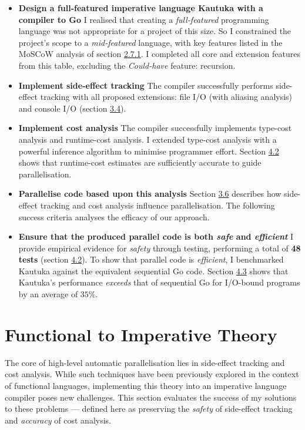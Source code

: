 \begin{itemize}[itemindent=-1cm]
  \item[] \textbf{Design a full-featured imperative language Kautuka with a compiler to Go} I realised that creating a \textit{full-featured} programming language was not appropriate for a project of this size. So I constrained the project's scope to a \textit{mid-featured} language, with key features listed in the MoSCoW analysis of section \hyperref[sec:2.7.1]{2.7.1}. I completed all core and extension features from this table, excluding the \textit{Could-have} feature: recursion.
  \item[] \textbf{Implement side-effect tracking} The compiler successfully performs side-effect tracking with all proposed extensions: file I/O (with aliasing analysis) and console I/O (section \hyperref[sec:3.4]{3.4}).
  \item[] \textbf{Implement cost analysis} The compiler successfully implements type-cost analysis and runtime-cost analysis. I extended type-cost analysis with a powerful inference algorithm to minimise programmer effort. Section \hyperref[sec:4.2]{4.2} shows that runtime-cost estimates are sufficiently accurate to guide parallelisation.
  \item[] \textbf{Parallelise code based upon this analysis} Section \hyperref[sec:3.6]{3.6} describes how side-effect tracking and cost analysis influence parallelisation. The following success criteria analyses the efficacy of our approach.
  \item[] \textbf{Ensure that the produced parallel code is both \textit{safe} and \textit{efficient}} I provide empirical evidence for \textit{safety} through testing, performing a total of \textbf{48 tests} (section \hyperref[sec:4.2]{4.2}). To show that parallel code is \textit{efficient}, I benchmarked Kautuka against the equivalent sequential Go code. Section \hyperref[sec:4.3]{4.3} shows that Kautuka's performance \textit{exceeds} that of sequential Go for I/O-bound programs by an average of \( 35\% \).

\end{itemize}


\section{Functional to Imperative Theory}

\label{sec:4.2}

The core of high-level automatic parallelisation lies in side-effect tracking and cost analysis. While such techniques have been previously explored in the context of functional languages, implementing this theory into an imperative language compiler poses new challenges. This section evaluates the success of my solutions to these problems --- defined here as preserving the \textit{safety} of side-effect tracking and \textit{accuracy} of cost analysis.

